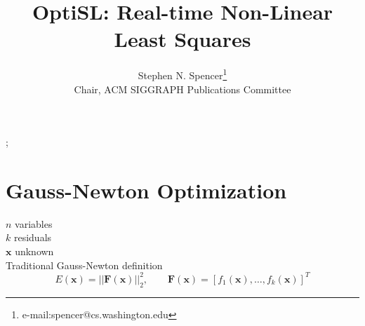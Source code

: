 \documentclass[review]{acmsiggraph}
\title{OptiSL: Real-time Non-Linear Least Squares}
\author{Stephen N. Spencer\thanks{e-mail:spencer@cs.washington.edu}\\Chair, ACM SIGGRAPH Publications Committee}
\begin{document}


\maketitle

\begin{abstract}


\end{abstract}

\begin{CRcatlist}
  ;
\end{CRcatlist}

\keywordlist


\copyrightspace

\section{Gauss-Newton Optimization}
$n$ variables\\
$k$ residuals\\
$\mathbf{x}$ unknown\\
Traditional Gauss-Newton definition
$$E (\mathbf{x}) = || \mathbf{F}(\mathbf{x}) ||_2^2,\qquad \mathbf{F}(\mathbf{x})  =[f_1(\mathbf{x}), \hdots, f_k(\mathbf{x})]^T$$
\end{document}
